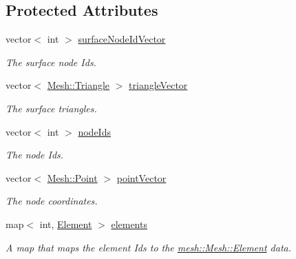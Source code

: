 \subsection*{Protected Attributes}
\begin{DoxyCompactItemize}
\item 
\hypertarget{classmesh_1_1_mesh_ac32a7d59a92de7a1e4eaf5b016d63dff}{
vector$<$ int $>$ \hyperlink{classmesh_1_1_mesh_ac32a7d59a92de7a1e4eaf5b016d63dff}{surfaceNodeIdVector}}
\label{classmesh_1_1_mesh_ac32a7d59a92de7a1e4eaf5b016d63dff}

\begin{DoxyCompactList}\small\item\em The surface node Ids. \item\end{DoxyCompactList}\item 
\hypertarget{classmesh_1_1_mesh_acdbed9293a87ffde0887764db16809ef}{
vector$<$ \hyperlink{structmesh_1_1_mesh_1_1_triangle}{Mesh::Triangle} $>$ \hyperlink{classmesh_1_1_mesh_acdbed9293a87ffde0887764db16809ef}{triangleVector}}
\label{classmesh_1_1_mesh_acdbed9293a87ffde0887764db16809ef}

\begin{DoxyCompactList}\small\item\em The surface triangles. \item\end{DoxyCompactList}\item 
\hypertarget{classmesh_1_1_mesh_a1caa15084eed4de46071cdb1da774069}{
vector$<$ int $>$ \hyperlink{classmesh_1_1_mesh_a1caa15084eed4de46071cdb1da774069}{nodeIds}}
\label{classmesh_1_1_mesh_a1caa15084eed4de46071cdb1da774069}

\begin{DoxyCompactList}\small\item\em The node Ids. \item\end{DoxyCompactList}\item 
\hypertarget{classmesh_1_1_mesh_ac004fba269ab0a78d688360865d5ae1a}{
vector$<$ \hyperlink{structmesh_1_1_mesh_1_1_point}{Mesh::Point} $>$ \hyperlink{classmesh_1_1_mesh_ac004fba269ab0a78d688360865d5ae1a}{pointVector}}
\label{classmesh_1_1_mesh_ac004fba269ab0a78d688360865d5ae1a}

\begin{DoxyCompactList}\small\item\em The node coordinates. \item\end{DoxyCompactList}\item 
\hypertarget{classmesh_1_1_mesh_a96bc5c338398ead84b1ab2aa9b664d06}{
map$<$ int, \hyperlink{structmesh_1_1_mesh_1_1_element}{Element} $>$ \hyperlink{classmesh_1_1_mesh_a96bc5c338398ead84b1ab2aa9b664d06}{elements}}
\label{classmesh_1_1_mesh_a96bc5c338398ead84b1ab2aa9b664d06}

\begin{DoxyCompactList}\small\item\em A map that maps the element Ids to the \hyperlink{structmesh_1_1_mesh_1_1_element}{mesh::Mesh::Element} data. \item\end{DoxyCompactList}\end{DoxyCompactItemize}

